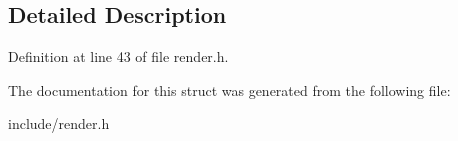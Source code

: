 \subsection{Detailed Description}


Definition at line 43 of file render.\-h.



The documentation for this struct was generated from the following file\-:\begin{DoxyCompactItemize}
\item 
include/render.\-h\end{DoxyCompactItemize}
